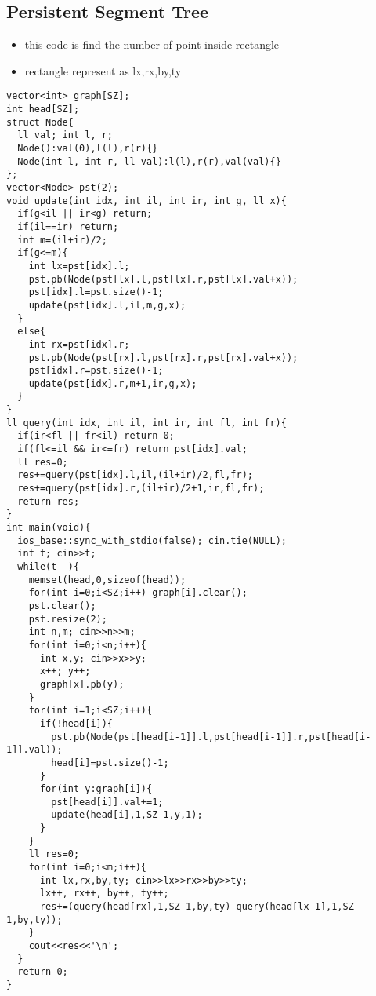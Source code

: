 \documentclass[landscape, 8pt, a4paper, oneside, twocolumn]{extarticle}
\begin{document}
\subsection{Persistent Segment Tree}
\begin{itemize}
    \item this code is find the number of point inside rectangle
    \item rectangle represent as lx,rx,by,ty
\end{itemize}
\begin{verbatim}
vector<int> graph[SZ];
int head[SZ];
struct Node{
  ll val; int l, r;
  Node():val(0),l(l),r(r){}
  Node(int l, int r, ll val):l(l),r(r),val(val){}
};
vector<Node> pst(2);
void update(int idx, int il, int ir, int g, ll x){
  if(g<il || ir<g) return;
  if(il==ir) return;
  int m=(il+ir)/2;
  if(g<=m){
    int lx=pst[idx].l;
    pst.pb(Node(pst[lx].l,pst[lx].r,pst[lx].val+x));
    pst[idx].l=pst.size()-1;
    update(pst[idx].l,il,m,g,x);
  }
  else{
    int rx=pst[idx].r;
    pst.pb(Node(pst[rx].l,pst[rx].r,pst[rx].val+x));
    pst[idx].r=pst.size()-1;
    update(pst[idx].r,m+1,ir,g,x);
  }
}
ll query(int idx, int il, int ir, int fl, int fr){
  if(ir<fl || fr<il) return 0;
  if(fl<=il && ir<=fr) return pst[idx].val;
  ll res=0;
  res+=query(pst[idx].l,il,(il+ir)/2,fl,fr);
  res+=query(pst[idx].r,(il+ir)/2+1,ir,fl,fr);
  return res;
}
int main(void){
  ios_base::sync_with_stdio(false); cin.tie(NULL);
  int t; cin>>t;
  while(t--){
    memset(head,0,sizeof(head));
    for(int i=0;i<SZ;i++) graph[i].clear();
    pst.clear();
    pst.resize(2);
    int n,m; cin>>n>>m;
    for(int i=0;i<n;i++){
      int x,y; cin>>x>>y;
      x++; y++;
      graph[x].pb(y);
    }
    for(int i=1;i<SZ;i++){
      if(!head[i]){
        pst.pb(Node(pst[head[i-1]].l,pst[head[i-1]].r,pst[head[i-1]].val));
        head[i]=pst.size()-1;
      }
      for(int y:graph[i]){
        pst[head[i]].val+=1;
        update(head[i],1,SZ-1,y,1);
      }
    }  
    ll res=0;
    for(int i=0;i<m;i++){
      int lx,rx,by,ty; cin>>lx>>rx>>by>>ty;
      lx++, rx++, by++, ty++;
      res+=(query(head[rx],1,SZ-1,by,ty)-query(head[lx-1],1,SZ-1,by,ty));
    }
    cout<<res<<'\n';
  }
  return 0;
}
\end{verbatim}
\end{document}
